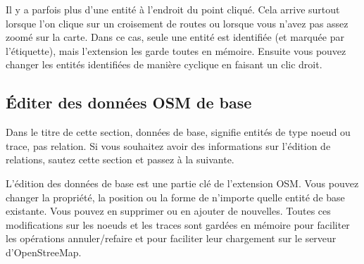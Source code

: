 Il y a parfois plus d'une entité à l'endroit du point cliqué. Cela arrive surtout lorsque l'on clique sur un croisement de routes ou lorsque vous n'avez pas assez zoomé sur la carte. Dans ce cas, seule une entité est identifiée (et marquée par l'étiquette), mais l'extension les garde toutes en mémoire. Ensuite vous pouvez changer les entités identifiées de manière cyclique en faisant un clic droit.

\subsection{Éditer des données OSM de base}

Dans le titre de cette section, données de base, signifie entités de type noeud ou trace, pas relation. Si vous souhaitez avoir des informations sur l'édition de relations, sautez cette section et passez à la suivante.
 
L'édition des données de base est une partie clé de l'extension OSM. Vous pouvez changer la propriété, la position ou la forme de n'importe quelle entité de base existante. Vous pouvez en supprimer ou en ajouter de nouvelles. Toutes ces modifications sur les noeuds et les traces sont gardées en mémoire pour faciliter les opérations annuler/refaire et pour faciliter leur chargement sur le serveur d'OpenStreeMap.


